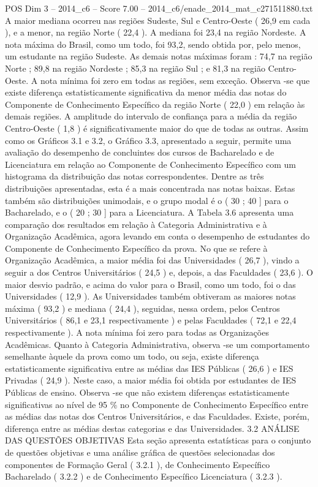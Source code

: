 \begin{textsample}{POS Dim 3 – 2014\_c6 – Score 7.00 – 2014\_c6/enade\_2014\_mat\_c271511880.txt}
A maior mediana ocorreu nas regiões Sudeste, Sul e Centro-Oeste ( 26,9 em cada ), e a menor, na região Norte ( 22,4 ).
A mediana foi 23,4 na região Nordeste.
A nota máxima do Brasil, como um todo, foi 93,2, sendo obtida por, pelo menos, um estudante na região Sudeste.
As demais notas máximas foram : 74,7 na região Norte ; 89,8 na região Nordeste ; 85,3 na região Sul ; e 81,3 na região Centro-Oeste.
A nota mínima foi zero em todas as regiões, sem exceção.
Observa -se que existe diferença estatisticamente significativa da menor média das notas do Componente de Conhecimento Específico da região Norte ( 22,0 ) em relação às demais regiões.
A amplitude do intervalo de confiança para a média da região Centro-Oeste ( 1,8 ) é significativamente maior do que de todas as outras.
Assim como os Gráficos 3.1 e 3.2, o Gráfico 3.3, apresentado a seguir, permite uma avaliação do desempenho de concluintes dos cursos de Bacharelado e de Licenciatura em relação ao Componente de Conhecimento Específico com um histograma da distribuição das notas correspondentes.
Dentre as três distribuições apresentadas, esta é a mais concentrada nas notas baixas.
Estas também são distribuições unimodais, e o grupo modal é o ( 30 ; 40 ] para o Bacharelado, e o ( 20 ; 30 ] para a Licenciatura.
A Tabela 3.6 apresenta uma comparação dos resultados em relação à Categoria Administrativa e à Organização Acadêmica, agora levando em conta o desempenho de estudantes do Componente de Conhecimento Específico da prova.
No que se refere à Organização Acadêmica, a maior média foi das Universidades ( 26,7 ), vindo a seguir a dos Centros Universitários ( 24,5 ) e, depois, a das Faculdades ( 23,6 ).
O maior desvio padrão, e acima do valor para o Brasil, como um todo, foi o das Universidades ( 12,9 ).
As Universidades também obtiveram as maiores notas máxima ( 93,2 ) e mediana ( 24,4 ), seguidas, nessa ordem, pelos Centros Universitários ( 86,1 e 23,1 respectivamente ) e pelas Faculdades ( 72,1 e 22,4 respectivamente ).
A nota mínima foi zero para todas as Organizações Acadêmicas.
Quanto à Categoria Administrativa, observa -se um comportamento semelhante àquele da prova como um todo, ou seja, existe diferença estatisticamente significativa entre as médias das IES Públicas ( 26,6 ) e IES Privadas ( 24,9 ).
Neste caso, a maior média foi obtida por estudantes de IES Públicas de ensino.
Observa -se que não existem diferenças estatisticamente significativas ao nível de 95 \% no Componente de Conhecimento Específico entre as médias das notas dos Centros Universitários, e das Faculdades.
Existe, porém, diferença entre as médias destas categorias e das Universidades. 3.2 ANÁLISE DAS QUESTÕES OBJETIVAS Esta seção apresenta estatísticas para o conjunto de questões objetivas e uma análise gráfica de questões selecionadas dos componentes de Formação Geral ( 3.2.1 ), de Conhecimento Específico Bacharelado ( 3.2.2 ) e de Conhecimento Específico Licenciatura ( 3.2.3 ).

\end{textsample}
